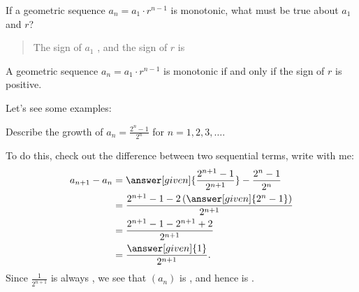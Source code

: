 \documentclass{ximera}
\begin{document}
\begin{question}
  If a geometric sequence $a_n = a_1 \cdot r^{n-1}$ is monotonic, what
  must be true about $a_1$ and $r$?
  \begin{prompt}
    \begin{quote}
      The sign of $a_1$ , and the sign of
      $r$ is 
    \end{quote}
  \end{prompt}
    \begin{feedback}
    A geometric sequence $a_n = a_1 \cdot r^{n-1}$ is monotonic if and
    only if the sign of $r$ is positive.
  \end{feedback}
\end{question}

Let's see some examples:
\begin{example}
  Describe the growth of $a_n = \frac{2^n-1}{2^n}$ for
  $n=1,2,3,\dots$.
  \begin{explanation}
    To do this, check out the difference between two sequential terms,
    write with me:
    \begin{align*}
    a_{n+1} - a_n &= \answer[given]{\frac{2^{n+1}-1}{2^{n+1}}} - \frac{2^n-1}{2^n}\\
    &=\frac{2^{n+1}-1 - 2\left(\answer[given]{2^n-1}\right)}{2^{n+1}}\\
    &=\frac{2^{n+1}-1 - 2^{n+1}+2}{2^{n+1}}\\
    &=\frac{\answer[given]{1}}{2^{n+1}}.
    \end{align*}
    Since $\frac{1}{2^{n+1}}$ is always
    ,
    we see that $(a_n)$ is
    , and hence is .
  \end{explanation}
\end{example}
\end{document}
